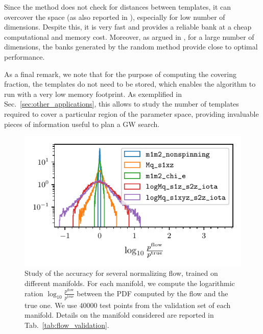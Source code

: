 \documentclass[twocolumn,showpacs,preprintnumbers,nofootinbib,prd,
superscriptaddress,10pt]{revtex4-2}
\begin{document}
Since the method does not check for distances between templates, it can overcover the space (as also reported in \cite{Messenger:2008ta, Coogan:2022qxs}), especially for low number of dimensions.
Despite this, it is very fast and provides a reliable bank at a cheap computational and memory cost.
Moreover, as argued in \cite{Messenger:2008ta, Allen:2021yuy, Allen:2022lqr}, for a large number of dimensions, the banks generated by the random method provide close to optimal performance.

As a final remark, we note that for the purpose of computing the covering fraction, the templates do not need to be stored, which enables the algorithm to run with a very low memory footprint.
As exemplified in Sec.~\ref{sec:other_applications}, this allows to study the number of templates required to cover a particular region of the parameter space, providing invaluable pieces of information useful to plan a GW search.

\begin{figure}[t]
	\centering
	\includegraphics[scale = 1.]{flow_validation}
	\caption{Study of the accuracy for several normalizing flow, trained on different manifolds. For each manifold, we compute the logarithmic ration $\log_{10}\frac{p^\mathrm{flow}}{p^\mathrm{true}}$ between the PDF computed by the flow and the true one. We use $40000$ test points from the validation set of each manifold. Details on the manifold considered are reported in Tab.~\ref{tab:flow_validation}.}
	\label{fig:flow_validation}
\end{figure}
\end{document}
